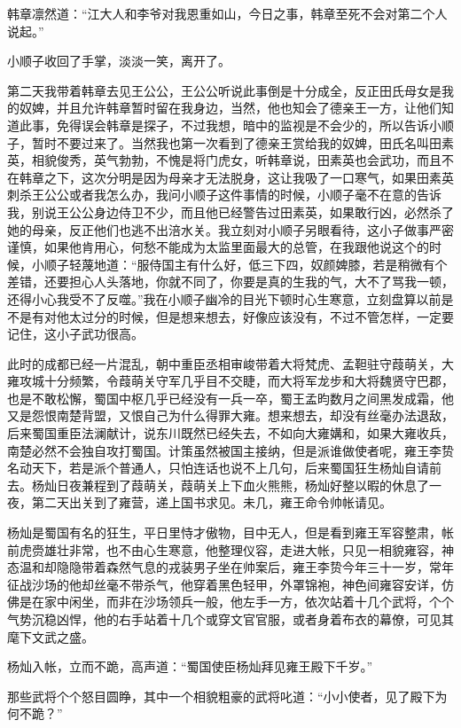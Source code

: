 韩章凛然道：“江大人和李爷对我恩重如山，今日之事，韩章至死不会对第二个人说起。”

小顺子收回了手掌，淡淡一笑，离开了。

第二天我带着韩章去见王公公，王公公听说此事倒是十分成全，反正田氏母女是我的奴婢，并且允许韩章暂时留在我身边，当然，他也知会了德亲王一方，让他们知道此事，免得误会韩章是探子，不过我想，暗中的监视是不会少的，所以告诉小顺子，暂时不要过来了。当然我也第一次看到了德亲王赏给我的奴婢，田氏名叫田素英，相貌俊秀，英气勃勃，不愧是将门虎女，听韩章说，田素英也会武功，而且不在韩章之下，这次分明是因为母亲才无法脱身，这让我吸了一口寒气，如果田素英刺杀王公公或者我怎么办，我问小顺子这件事情的时候，小顺子毫不在意的告诉我，别说王公公身边侍卫不少，而且他已经警告过田素英，如果敢行凶，必然杀了她的母亲，反正他们也逃不出涪水关。我立刻对小顺子另眼看待，这小子做事严密谨慎，如果他肯用心，何愁不能成为太监里面最大的总管，在我跟他说这个的时候，小顺子轻蔑地道：“服侍国主有什么好，低三下四，奴颜婢膝，若是稍微有个差错，还要担心人头落地，你就不同了，你要是真的生我的气，大不了骂我一顿，还得小心我受不了反噬。”我在小顺子幽冷的目光下顿时心生寒意，立刻盘算以前是不是有对他太过分的时候，但是想来想去，好像应该没有，不过不管怎样，一定要记住，这小子武功很高。

此时的成都已经一片混乱，朝中重臣丞相审峻带着大将梵虎、孟靼驻守葭萌关，大雍攻城十分频繁，令葭萌关守军几乎目不交睫，而大将军龙步和大将魏贤守巴郡，也是不敢松懈，蜀国中枢几乎已经没有一兵一卒，蜀王孟昀数月之间黑发成霜，他又是怨恨南楚背盟，又恨自己为什么得罪大雍。想来想去，却没有丝毫办法退敌，后来蜀国重臣法澜献计，说东川既然已经失去，不如向大雍媾和，如果大雍收兵，南楚必然不会独自攻打蜀国。计策虽然被国主接纳，但是派谁做使者呢，雍王李贽名动天下，若是派个普通人，只怕连话也说不上几句，后来蜀国狂生杨灿自请前去。杨灿日夜兼程到了葭萌关，葭萌关上下血火熊熊，杨灿好整以暇的休息了一夜，第二天出关到了雍营，递上国书求见。未几，雍王命令帅帐请见。

杨灿是蜀国有名的狂生，平日里恃才傲物，目中无人，但是看到雍王军容整肃，帐前虎赍雄壮非常，也不由心生寒意，他整理仪容，走进大帐，只见一相貌雍容，神态温和却隐隐带着森然气息的戎装男子坐在帅案后，雍王李贽今年三十一岁，常年征战沙场的他却丝毫不带杀气，他穿着黑色轻甲，外罩锦袍，神色间雍容安详，仿佛是在家中闲坐，而非在沙场领兵一般，他左手一方，依次站着十几个武将，个个气势沉稳凶悍，他的右手站着十几个或穿文官官服，或者身着布衣的幕僚，可见其麾下文武之盛。

杨灿入帐，立而不跪，高声道：“蜀国使臣杨灿拜见雍王殿下千岁。”

那些武将个个怒目圆睁，其中一个相貌粗豪的武将叱道：“小小使者，见了殿下为何不跪？”

